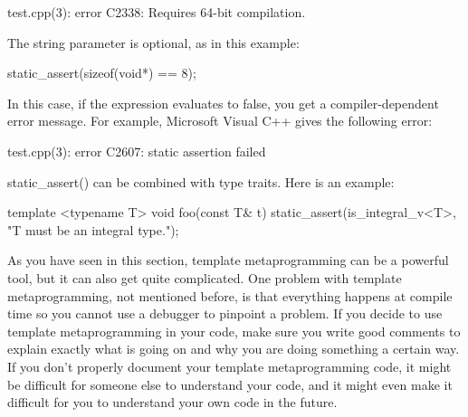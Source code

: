 \begin{shell}
test.cpp(3): error C2338: Requires 64-bit compilation.
\end{shell}

The string parameter is optional, as in this example:

\begin{cpp}
static_assert(sizeof(void*) == 8);
\end{cpp}

In this case, if the expression evaluates to false, you get a compiler-dependent error message. For example, Microsoft Visual C++ gives the following error:

\begin{shell}
test.cpp(3): error C2607: static assertion failed
\end{shell}

static\_assert() can be combined with type traits. Here is an example:

\begin{cpp}
template <typename T>
void foo(const T& t)
{
    static_assert(is_integral_v<T>, "T must be an integral type.");
}
\end{cpp}


As you have seen in this section, template metaprogramming can be a powerful tool, but it can also get quite complicated. One problem with template metaprogramming, not mentioned before, is that everything happens at compile time so you cannot use a debugger to pinpoint a problem. If you decide to use template metaprogramming in your code, make sure you write good comments to explain exactly what is going on and why you are doing something a certain way. If you don’t properly document your template metaprogramming code, it might be difficult for someone else to understand your code, and it might even make it difficult for you to understand your own code in the future.






















